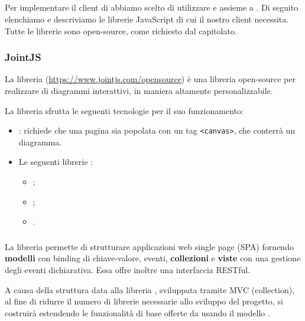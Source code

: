 


\subsection{}
Per implementare il client di \proj{} abbiamo scelto di utilizzare  e  assieme a . Di seguito elenchiamo e descriviamo le librerie JavaScript di cui il nostro client necessita. Tutte le librerie sono open-source, come richiesto dal capitolato.

\subsubsection{JointJS}
La libreria \jointjs{} (\url{https://www.jointjs.com/opensource}) è una libreria open-source per realizzare  di diagrammi interattivi, in maniera altamente personalizzabile. %

La libreria sfrutta le seguenti tecnologie per il suo funzionamento:

\begin{itemize}
	\item \html{}: \jointjs{} richiede che una pagina \html{} sia popolata con un tag \texttt{<canvas>}, che conterrà un diagramma.
	\item Le seguenti librerie \js{}:
	\begin{itemize}
		\item \jquery{};
		\item \lodash{};
		\item \backbonejs{}.
	\end{itemize}
\end{itemize}

\subsubsection{\backbonejs}
La libreria \backbonejs{} permette di strutturare applicazioni web single page (SPA) fornendo \textbf{modelli} con binding di chiave-valore, eventi, \textbf{collezioni} e \textbf{viste} con una gestione degli eventi dichiarativa. Essa offre inoltre una interfaccia RESTful.

A causa della struttura data alla libreria \jointjs{}, sviluppata tramite MVC (collection), al fine di ridurre il numero di librerie necessarie allo sviluppo del progetto, si costruirà \proj{} estendendo le funzionalità di base offerte da \jointjs{} usando il modello \mvc{}.


